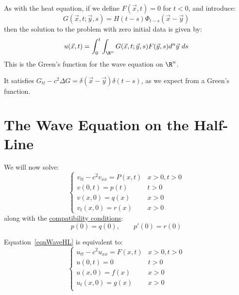 \documentclass[../Main.tex]{subfiles}
\begin{document}
As with the heat equation, if we define $F(\vec{x}, t) = 0$ for $t < 0$, and introduce:
\begin{equation*}
    G(\vec{x}, t;\vec{y}, s) = H(t - s) \Phi_{t - s}(\vec{x} - \vec{y})
\end{equation*}
then the solution to the problem with zero initial data is given by:
\begin{equation*}
    u(\vec{x}, t) = \int_0^t \int_{\R^n} G(\vec{x}, t; \vec{y}, s) F(\vec{y}, s) d^n \vec{y}~ds
\end{equation*}
This is the Green's function for the wave equation on $\R^n$.

It satisfies $G_{tt} - c^2 \Delta G = \delta(\vec{x} - \vec{y})\delta(t - s)$, as we expect from a Green's function.
\section{The Wave Equation on the Half-Line}
We will now solve:
\begin{equation}
    \begin{cases}
        v_{tt} - c^2 v_{xx} = P(x, t) & x > 0, t > 0 \\
        v(0, t) = p(t) & t > 0 \\
        v(x, 0) = q(x) & x > 0 \\
        v_t(x, 0) = r(x) & x > 0
    \end{cases}
    \label{eqnWaveHL}
\end{equation}
along with the \underline{compatibility conditions}:
\begin{equation*}
    p(0) = q(0),\qquad p'(0) = r(0)
\end{equation*}
\begin{proposition}
    Equation~\ref{eqnWaveHL} is equivalent to:
    \begin{equation}
        \begin{cases}
            u_{tt} - c^2 u_{xx} = F(x, t)  & x > 0, t > 0 \\
            u(0, t) = 0 & t > 0 \\
            u(x, 0) = f(x) & x > 0 \\
            u_t(x, 0) = g(x) & x > 0 \\
        \end{cases}
        \label{eqnWaveHLSimple}
    \end{equation}
    \label{propWaveHLSimple}
\end{proposition}
\end{document}
